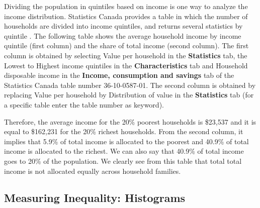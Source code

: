 \documentclass[letterpaper]{article}\usepackage[]{graphicx}\usepackage[]{color}
\numberwithin{exer}{section}
\theoremstyle{nonumberplain}
\begin{document}
Dividing the population in quintiles based on income is one way to
analyze the income distribution. Statistics Canada provides a table in
which the number of households are divided into income quintiles, and
returns several statistics by quintile \citep*{distribution3}. The
following table shows the average household income by income quintile
(first column) and the share of total income (second column). The
first column is obtained by selecting Value per household in the
\textbf{Statistics} tab, the Lowest to Highest income quintiles in the
\textbf{Characteristics} tab and Household disposable income in the
\textbf{Income, consumption and savings} tab of the Statistics Canada
table number 36-10-0587-01. The second column is obtained by replacing
Value per household by Distribution of value in the
\textbf{Statistics} tab (for a specific table enter the table number
as keyword).
\begin{center}
\end{center}
Therefore, the average income for the 20\% poorest households is
\$23,537 and it is equal
to \$162,231 for the 20\%
richest households. From the second column, it implies that
5.9\% of total income is allocated to the poorest and
40.9\% of total income is allocated to the richest. We can
also say that 40.9\% of total income goes to 20\% of the
population. We clearly see from this table that total total income is
not allocated equally across household families. 



\subsection{Measuring Inequality: Histograms}
\end{document}
